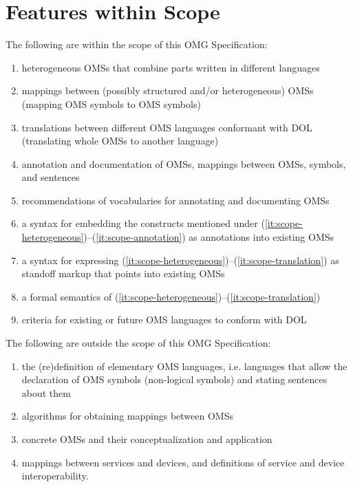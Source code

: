 \documentclass[10pt,%
\ifpretendfinal
final%
\else
draft%
\fi,
]{scrreprt}
\makeatletter
\newcommand*{\ie}{i.e.\@\xspace}
\newcommand*\CommentAuthor{}
\renewcommand*\CommentAuthor{#1}}
\newcommand*\CommentDate{}
\renewcommand*\CommentDate{#1}}
\newcommand*\CommentId{}
\renewcommand*\CommentId{#1}}
\newcommand*\CommentType{}
\renewcommand*\CommentType{#1}}
\newcommand*{\SetCommentColorByType}[1]{%
\edef\localType{{#1}}%
\expandafter\ifstrequal\localType{q-aut}{\colorlet{CommentColor}{red}}{%
\expandafter\ifstrequal\localType{q-all}{\colorlet{CommentColor}{orange}}{%
\expandafter\ifstrequal\localType{todo}{\colorlet{CommentColor}{orange}}{%
\expandafter\ifstrequal\localType{fyi}{\colorlet{CommentColor}{lightgray}}{%
\colorlet{CommentColor}{yellow}}}}}}
\newcommand*{\SetCommentPrefixByType}[1]{%
\edef\localType{{#1}}%
\expandafter\@ifmtarg\localType{%
\edef\CommentPrefix{}%
}{%
\caseupper[q]{#1}%
\edef\CommentPrefix{\thestring: }%
}}
\newcommand*{\initComment}[1]{%
\setkeys{Comment}{#1}%
\SetCommentColorByType{\CommentType}%
\relax%
\SetCommentPrefixByType{\CommentType}%
\relax%
}
\newcommand*{\todonote}[2][]{%
\initComment{#1}%
\pdfcomment[author=\CommentAuthor,color=CommentColor,date=\CommentDate,id=\CommentId]{%
\CommentPrefix
#2}}
\renewcommand*{\todonote}[2][]{%
\initComment{#1}%
\ednote{\CommentPrefix #2}}
\newcommand*{\IS}{OMG Specification\xspace}
\makeatother
\begin{document}
\section{Features within Scope}
The following are within the scope of this \IS:
\begin{enumerate}
\item\label{it:scope-heterogeneous} heterogeneous OMSs that combine parts written in different languages
\item mappings between (possibly structured and/or heterogeneous) OMSs (mapping
OMS symbols to OMS symbols)
\item \label{it:scope-translation} translations between different OMS languages conformant with DOL (translating whole OMSs to another language)
\item\label{it:scope-annotation} annotation and documentation of OMSs, mappings between OMSs, symbols,
and sentences
\item recommendations of vocabularies for annotating and documenting OMSs
\item a syntax for embedding the constructs mentioned under (\ref{it:scope-heterogeneous})–(\ref{it:scope-annotation}) as annotations into existing OMSs
\item a syntax for expressing (\ref{it:scope-heterogeneous})–(\ref{it:scope-translation}) as standoff markup that points into existing OMSs
\item a formal semantics of (\ref{it:scope-heterogeneous})–(\ref{it:scope-translation})
\item criteria for existing or future OMS languages to conform with DOL
\end{enumerate}


The following are outside the scope of this \IS:
\begin{enumerate}
\item the (re)definition of elementary OMS languages, \ie languages that allow the declaration of OMS symbols (non-logical symbols) 
and
stating sentences about them
\item algorithms for obtaining mappings between OMSs
\item concrete OMSs and their conceptualization and application
\item mappings between services and devices, and definitions of service and device interoperability.
\end{enumerate}
\end{document}
